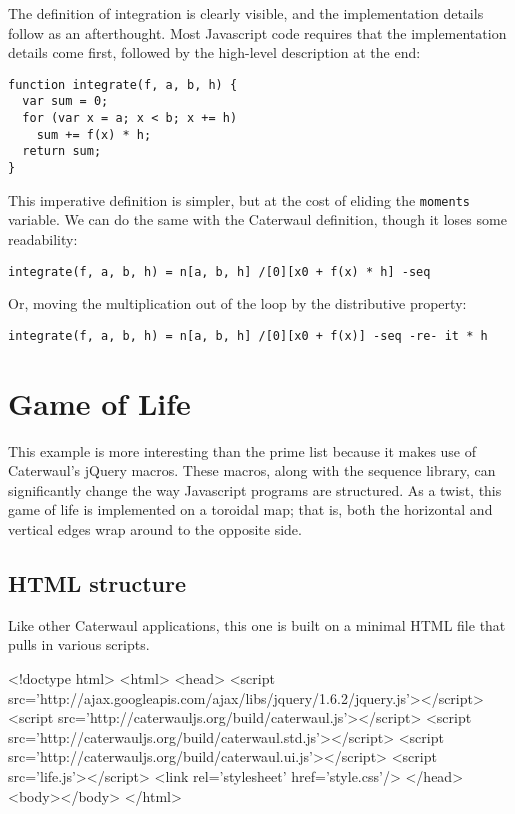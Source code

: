 \documentclass{report}
\begin{document}
    The definition of integration is clearly visible, and the implementation details follow as an afterthought. Most Javascript code requires that the implementation details come first,
    followed by the high-level description at the end:

\begin{verbatim}
function integrate(f, a, b, h) {
  var sum = 0;
  for (var x = a; x < b; x += h)
    sum += f(x) * h;
  return sum;
}
\end{verbatim}

    This imperative definition is simpler, but at the cost of eliding the {\tt moments} variable. We can do the same with the Caterwaul definition, though it loses some readability:

\begin{verbatim}
integrate(f, a, b, h) = n[a, b, h] /[0][x0 + f(x) * h] -seq
\end{verbatim}

    Or, moving the multiplication out of the loop by the distributive property:

\begin{verbatim}
integrate(f, a, b, h) = n[a, b, h] /[0][x0 + f(x)] -seq -re- it * h
\end{verbatim}

\chapter{Game of Life}\label{sec:game-of-life}
  This example is more interesting than the prime list because it makes use of Caterwaul's jQuery macros. These macros, along with the sequence library, can significantly change the way
  Javascript programs are structured. As a twist, this game of life is implemented on a toroidal map; that is, both the horizontal and vertical edges wrap around to the opposite side.

\section{HTML structure}
    Like other Caterwaul applications, this one is built on a minimal HTML file that pulls in various scripts.

\begin{resourcecode}
<!doctype html>
<html>
  <head>
  <script src='http://ajax.googleapis.com/ajax/libs/jquery/1.6.2/jquery.js'></script>
  <script src='http://caterwauljs.org/build/caterwaul.js'></script>
  <script src='http://caterwauljs.org/build/caterwaul.std.js'></script>
  <script src='http://caterwauljs.org/build/caterwaul.ui.js'></script>
  <script src='life.js'></script>
  <link rel='stylesheet' href='style.css'/>
  </head>
  <body></body>
</html> \end{resourcecode}
\end{document}
